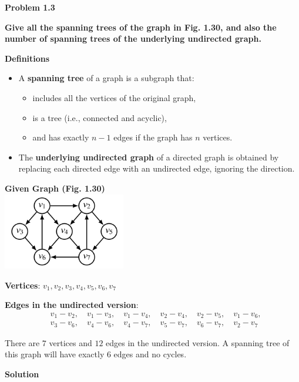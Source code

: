 \documentclass{article}
\begin{document}
\textbf{Problem 1.3}

\textbf{Give all the spanning trees of the graph in Fig. 1.30, and also the number of spanning trees of the underlying undirected graph.}

\textbf{Definitions}

\begin{itemize}
    \item A \textbf{spanning tree} of a graph is a subgraph that:
    \begin{itemize}
        \item includes all the vertices of the original graph,
        \item is a tree (i.e., connected and acyclic),
        \item and has exactly $n - 1$ edges if the graph has $n$ vertices.
    \end{itemize}

    \item The \textbf{underlying undirected graph} of a directed graph is obtained by replacing each directed edge with an undirected edge, ignoring the direction.
\end{itemize}

\textbf{Given Graph (Fig. 1.30)}\\
\includegraphics[width=0.4\textwidth]{Fig_1_30.png}

\textbf{Vertices}: $v_1, v_2, v_3, v_4, v_5, v_6, v_7$

\textbf{Edges in the undirected version}:
\[
\begin{aligned}
&v_1 - v_2,\quad v_1 - v_3,\quad v_1 - v_4,\quad v_2 - v_4,\quad v_2 - v_5, \quad v_1 - v_6, \\
&v_3 - v_6,\quad v_4 - v_6,\quad v_4 - v_7,\quad v_5 - v_7,\quad v_6 - v_7, \quad v_2 - v_7
\end{aligned}
\]

There are $7$ vertices and $12$ edges in the undirected version. A spanning tree of this graph will have exactly $6$ edges and no cycles.

\textbf{Solution}
\end{document}
